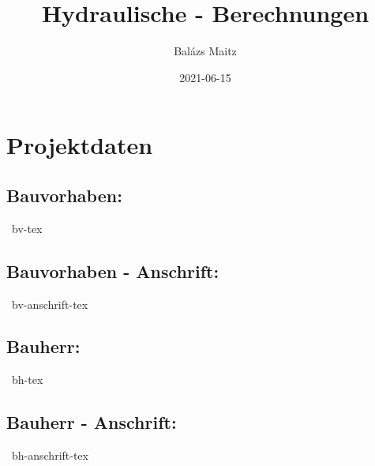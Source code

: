 \documentclass[12pt]{report}
\author{Balázs Maitz} %
\title{Hydraulische - Berechnungen} %
\date{2021-06-15} %
\begin{document}
\maketitle
\tableofcontents


\pagebreak


\chapter*{Projektdaten}

\section*{Bauvorhaben:} \ bv-tex\\
\section*{Bauvorhaben - Anschrift:} \ bv-anschrift-tex\\
\section*{Bauherr:} \ bh-tex\\
\section*{Bauherr - Anschrift:} \ bh-anschrift-tex\\

\pagebreak


\end{document}
